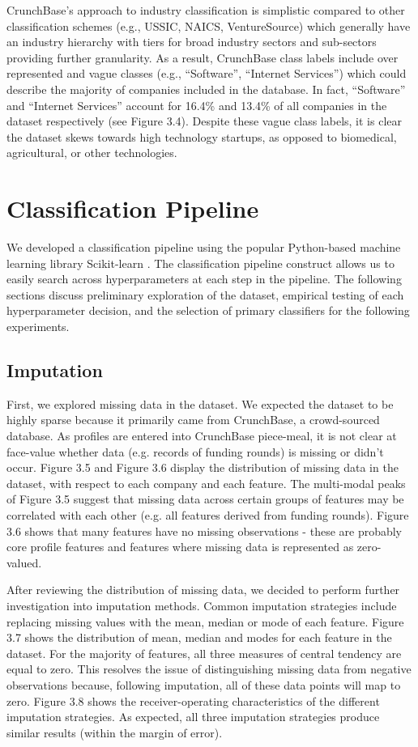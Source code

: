 \documentclass[../thesis/thesis.tex]{subfiles}
\begin{document}
CrunchBase’s approach to industry classification is simplistic compared to other classification schemes (e.g., USSIC, NAICS, VentureSource) which generally have an industry hierarchy with tiers for broad industry sectors and sub-sectors providing further granularity. As a result, CrunchBase class labels include over represented and vague classes (e.g., “Software”, “Internet Services”) which could describe the majority of companies included in the database. In fact, “Software” and “Internet Services” account for 16.4\% and 13.4\% of all companies in the dataset respectively (see Figure 3.4). Despite these vague class labels, it is clear the dataset skews towards high technology startups, as opposed to biomedical, agricultural, or other technologies.

\section{Classification Pipeline}

We developed a classification pipeline using the popular Python-based machine learning library Scikit-learn \cite{pedregosa2011}. The classification pipeline construct allows us to easily search across hyperparameters at each step in the pipeline. The following sections discuss preliminary exploration of the dataset, empirical testing of each hyperparameter decision, and the selection of primary classifiers for the following experiments.

\subsection{Imputation}

First, we explored missing data in the dataset. We expected the dataset to be highly sparse because it primarily came from CrunchBase, a crowd-sourced database. As profiles are entered into CrunchBase piece-meal, it is not clear at face-value whether data (e.g. records of funding rounds) is missing or didn’t occur. Figure 3.5 and Figure 3.6 display the distribution of missing data in the dataset, with respect to each company and each feature. The multi-modal peaks of Figure 3.5 suggest that missing data across certain groups of features may be correlated with each other (e.g. all features derived from funding rounds).  Figure 3.6 shows that many features have no missing observations - these are probably core profile features and features where missing data is represented as zero-valued.

After reviewing the distribution of missing data, we decided to perform further investigation into imputation methods. Common imputation strategies include replacing missing values with the mean, median or mode of each feature. Figure 3.7 shows the distribution of mean, median and modes for each feature in the dataset. For the majority of features, all three measures of central tendency are equal to zero. This resolves the issue of distinguishing missing data from negative observations because, following imputation, all of these data points will map to zero. Figure 3.8 shows the receiver-operating characteristics of the different imputation strategies. As expected, all three imputation strategies produce similar results (within the margin of error).
\end{document}
